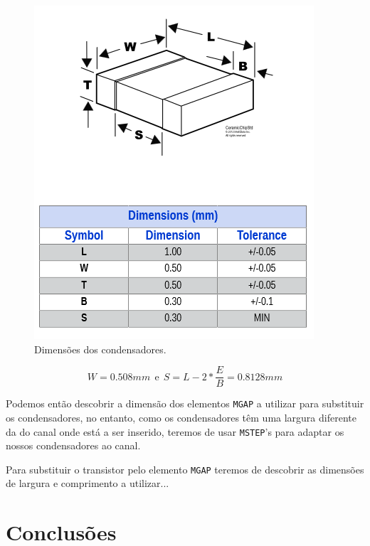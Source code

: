 \documentclass[11pt]{article}
\numberwithin{equation}{section}
\begin{document}
\begin{figure}[H]
	\centering
	\includegraphics[keepaspectratio=true, scale=0.45]{teoricas/capacitor}
	\vspace{-0.5em}
	\caption{Dimensões dos condensadores.}
	\vspace{-0.8em}
	\label{fig:capacitor}
\end{figure}

\begin{equation}
W = 0.508 mm ~~ \text{e} ~~ S = L - 2*\frac{E}{B} = 0.8128 mm
\label{eq:capacitor}
\end{equation}

Podemos então descobrir a dimensão dos elementos \texttt{MGAP} a utilizar para substituir os condensadores, no entanto, como os condensadores têm uma largura diferente da do canal onde está a ser inserido, teremos de usar \texttt{MSTEP}'s para adaptar os nossos condensadores ao canal.

Para substituir o transistor pelo elemento \texttt{MGAP} teremos de descobrir as dimensões de largura e comprimento a utilizar...


\section{Conclusões}
\end{document}
